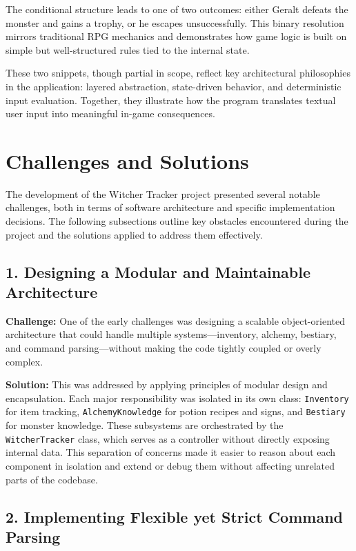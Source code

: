 \documentclass{article}
\begin{document}
The conditional structure leads to one of two outcomes: either Geralt defeats the monster and gains a trophy, or he escapes unsuccessfully. This binary resolution mirrors traditional RPG mechanics and demonstrates how game logic is built on simple but well-structured rules tied to the internal state.

These two snippets, though partial in scope, reflect key architectural philosophies in the application: layered abstraction, state-driven behavior, and deterministic input evaluation. Together, they illustrate how the program translates textual user input into meaningful in-game consequences.

\section{Challenges and Solutions}

The development of the Witcher Tracker project presented several notable challenges, both in terms of software architecture and specific implementation decisions. The following subsections outline key obstacles encountered during the project and the solutions applied to address them effectively.

\subsection*{1. Designing a Modular and Maintainable Architecture}

\textbf{Challenge:}  
One of the early challenges was designing a scalable object-oriented architecture that could handle multiple systems—inventory, alchemy, bestiary, and command parsing—without making the code tightly coupled or overly complex.

\textbf{Solution:}  
This was addressed by applying principles of modular design and encapsulation. Each major responsibility was isolated in its own class: \texttt{Inventory} for item tracking, \texttt{AlchemyKnowledge} for potion recipes and signs, and \texttt{Bestiary} for monster knowledge. These subsystems are orchestrated by the \texttt{WitcherTracker} class, which serves as a controller without directly exposing internal data. This separation of concerns made it easier to reason about each component in isolation and extend or debug them without affecting unrelated parts of the codebase.

\subsection*{2. Implementing Flexible yet Strict Command Parsing}
\end{document}
